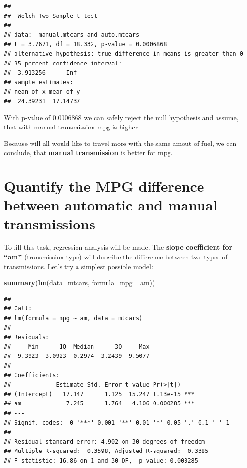 \documentclass[10pt,]{article}
\newenvironment{Shaded}{\begin{snugshade}}{\end{snugshade}}
\newcommand{\KeywordTok}[1]{\textcolor[rgb]{0.13,0.29,0.53}{\textbf{{#1}}}}
\newcommand{\DataTypeTok}[1]{\textcolor[rgb]{0.13,0.29,0.53}{{#1}}}
\newcommand{\StringTok}[1]{\textcolor[rgb]{0.31,0.60,0.02}{{#1}}}
\newcommand{\NormalTok}[1]{{#1}}
\begin{document}
\begin{verbatim}
## 
##  Welch Two Sample t-test
## 
## data:  manual.mtcars and auto.mtcars
## t = 3.7671, df = 18.332, p-value = 0.0006868
## alternative hypothesis: true difference in means is greater than 0
## 95 percent confidence interval:
##  3.913256      Inf
## sample estimates:
## mean of x mean of y 
##  24.39231  17.14737
\end{verbatim}

With p-value of 0.0006868 we can safely reject the null hypothesis and
assume, that with manual transmission mpg is higher.

Because will all would like to travel more with the same amout of fuel,
we can conclude, that \textbf{manual transmission} is better for mpg.

\section{Quantify the MPG difference between automatic and manual
transmissions}\label{quantify-the-mpg-difference-between-automatic-and-manual-transmissions}

To fill this task, regression analysis will be made. The \textbf{slope
coefficient for ``am''} (transmission type) will describe the difference
between two types of transmissions. Let's try a simplest possible model:

\begin{Shaded}
\begin{Highlighting}[]
\KeywordTok{summary}\NormalTok{(}\KeywordTok{lm}\NormalTok{(}\DataTypeTok{data=}\NormalTok{mtcars, }\DataTypeTok{formula=}\NormalTok{mpg ~}\StringTok{ }\NormalTok{am))}
\end{Highlighting}
\end{Shaded}

\begin{verbatim}
## 
## Call:
## lm(formula = mpg ~ am, data = mtcars)
## 
## Residuals:
##     Min      1Q  Median      3Q     Max 
## -9.3923 -3.0923 -0.2974  3.2439  9.5077 
## 
## Coefficients:
##             Estimate Std. Error t value Pr(>|t|)    
## (Intercept)   17.147      1.125  15.247 1.13e-15 ***
## am             7.245      1.764   4.106 0.000285 ***
## ---
## Signif. codes:  0 '***' 0.001 '**' 0.01 '*' 0.05 '.' 0.1 ' ' 1
## 
## Residual standard error: 4.902 on 30 degrees of freedom
## Multiple R-squared:  0.3598, Adjusted R-squared:  0.3385 
## F-statistic: 16.86 on 1 and 30 DF,  p-value: 0.000285
\end{verbatim}
\end{document}
